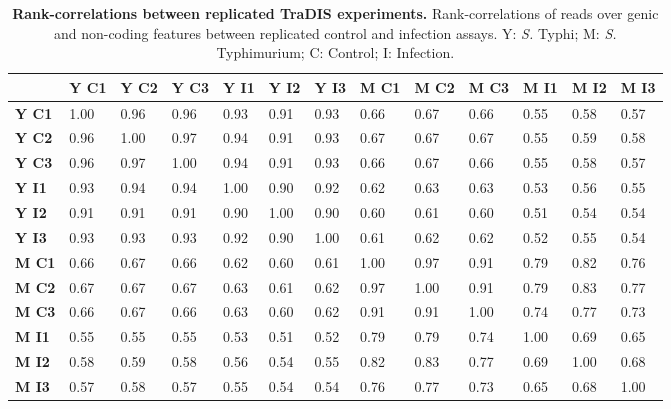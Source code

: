 %
\begin{table}
   \tiny
   \centering
   \noindent
    \caption[Rank-correlations between replicated TraDIS experiments]{\textbf{Rank-correlations between replicated TraDIS experiments.} Rank-correlations of reads over genic and non-coding features between replicated control and infection assays. Y: \textit{S.} Typhi; M: \textit{S.} Typhimurium; C: Control; I: Infection. }
    \begin{tabular}{ l
    				l
				l
				l
				l
				l
				l
				l
				l
				l
				l
				l
				l
				}
   
    \\
     \toprule
    &\textbf{Y C1} & \textbf{Y C2} & \textbf{Y C3} & \textbf{Y I1} & \textbf{Y I2} & \textbf{Y I3} &  \textbf{M C1}&  \textbf{M C2} &  \textbf{M C3} &  \textbf{M I1}&  \textbf{M I2}&  \textbf{M I3}\\
    \midrule
\textbf{Y C1} &   1.00 & 0.96 & 0.96 & 0.93 & 0.91 & 0.93 & 0.66 & 0.67 & 0.66 & 0.55 & 0.58 & 0.57\\
\textbf{Y C2} &  0.96 & 1.00 & 0.97 & 0.94 & 0.91 & 0.93 & 0.67 & 0.67 & 0.67 & 0.55 & 0.59 & 0.58\\
 \textbf{Y C3} & 0.96 & 0.97 & 1.00 & 0.94 & 0.91 & 0.93 & 0.66 & 0.67 & 0.66 & 0.55 & 0.58 & 0.57\\
 \textbf{Y I1} & 0.93 & 0.94 & 0.94 & 1.00 & 0.90 & 0.92 & 0.62 & 0.63 & 0.63 & 0.53 & 0.56 & 0.55\\
\textbf{Y I2} &  0.91 & 0.91 & 0.91 & 0.90 & 1.00 & 0.90 & 0.60 & 0.61 & 0.60 & 0.51 & 0.54 & 0.54\\
  \textbf{Y I3} & 0.93 & 0.93 & 0.93 & 0.92 & 0.90 & 1.00 & 0.61 & 0.62 & 0.62 & 0.52 & 0.55 & 0.54\\
 \textbf{M C1}&  0.66 & 0.67 & 0.66 & 0.62 & 0.60 & 0.61 & 1.00 & 0.97 & 0.91 & 0.79 & 0.82 & 0.76\\
\textbf{M C2}&  0.67 & 0.67 & 0.67 & 0.63 & 0.61 & 0.62 & 0.97 & 1.00 & 0.91 & 0.79 & 0.83 & 0.77\\
 \textbf{M C3} &  0.66 & 0.67 & 0.66 & 0.63 & 0.60 & 0.62 & 0.91 & 0.91 & 1.00 & 0.74 & 0.77 & 0.73\\
 \textbf{M I1} & 0.55 & 0.55 & 0.55 & 0.53 & 0.51 & 0.52 & 0.79 & 0.79 & 0.74 & 1.00 & 0.69 & 0.65\\
  \textbf{M I2} & 0.58 & 0.59 & 0.58 & 0.56 & 0.54 & 0.55 & 0.82 & 0.83 & 0.77 & 0.69 & 1.00 & 0.68\\
 \textbf{M I3} &  0.57 & 0.58 & 0.57 & 0.55 & 0.54 & 0.54 & 0.76 & 0.77 & 0.73 & 0.65 & 0.68 & 1.00\\
    \bottomrule
    \end{tabular}%
    \label{tab:corr}%
\end{table}

